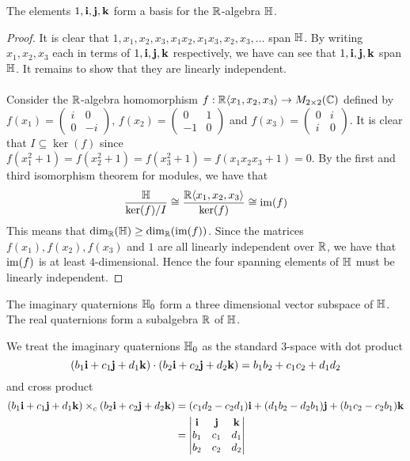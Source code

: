 \documentclass[a4paper]{article}
\begin{document}
\begin{prp}{}{} The elements $1,\vb{i},\vb{j},\vb{k}$ form a basis for the $\mathbb{R}$-algebra $\mathbb{H}$. \tcbline
\begin{proof}
It is clear that $1,x_1,x_2,x_3,x_1x_2,x_1x_3,x_2,x_3,\dots$ span $\mathbb{H}$. By writing $x_1,x_2,x_3$ each in terms of $1,\vb{i},\vb{j},\vb{k}$ respectively, we have can see that $1,\vb{i},\vb{j},\vb{k}$ span $\mathbb{H}$. It remains to show that they are linearly independent. \\~\\

Consider the $\mathbb{R}$-algebra homomorphism $f:\mathbb{R}\langle x_1,x_2,x_3\rangle\to M_{2\times 2}(\mathbb{C})$ defined by $f(x_1)=\begin{pmatrix}
i & 0\\
0 & -i
\end{pmatrix}$, $f(x_2)=\begin{pmatrix}
0 & 1\\
-1 & 0
\end{pmatrix}$ and $f(x_3)=\begin{pmatrix}
0 & i\\
i & 0
\end{pmatrix}$. It is clear that $I\subseteq\ker(f)$ since $f(x_1^2+1)=f(x_2^2+1)=f(x_3^2+1)=f(x_1x_2x_3+1)=0$. By the first and third isomorphism theorem for modules, we have that $$\frac{\mathbb{H}}{\ker(f)/I}\cong\frac{\mathbb{R}\langle x_1,x_2,x_3\rangle}{\ker(f)}\cong\operatorname{im}(f)$$
This means that $\dim_{\mathbb{R}}(\mathbb{H})\geq\dim_{\mathbb{R}}(\operatorname{im}(f))$. Since the matrices $f(x_1),f(x_2),f(x_3)$ and $1$ are all linearly independent over $\mathbb{R}$, we have that $\operatorname{im}(f)$ is at least $4$-dimensional. Hence the four spanning elements of $\mathbb{H}$ must be linearly independent. 
\end{proof}
\end{prp}

\begin{prp}{}{} The imaginary quaternions $\mathbb{H}_0$ form a three dimensional vector subspace of $\mathbb{H}$. The real quaternions form a subalgebra $\mathbb{R}$ of $\mathbb{H}$. 
\end{prp}

We treat the imaginary quaternions $\mathbb{H}_0$ as the standard $3$-space with dot product $$(b_1\vb{i}+c_1\vb{j}+d_1\vb{k})\cdot(b_2\vb{i}+c_2\vb{j}+d_2\vb{k})=b_1b_2+c_1c_2+d_1d_2$$ and cross product 
\begin{align*}
(b_1\vb{i}+c_1\vb{j}+d_1\vb{k})\times_c(b_2\vb{i}+c_2\vb{j}+d_2\vb{k})&=(c_1d_2-c_2d_1)\vb{i}+(d_1b_2-d_2b_1)\vb{j}+(b_1c_2-c_2b_1)\vb{k}\\
&=\begin{vmatrix}
\vb{i} & \vb{j} & \vb{k}\\
b_1 & c_1 & d_1\\
b_2 & c_2 & d_2
\end{vmatrix}
\end{align*}
\end{document}
